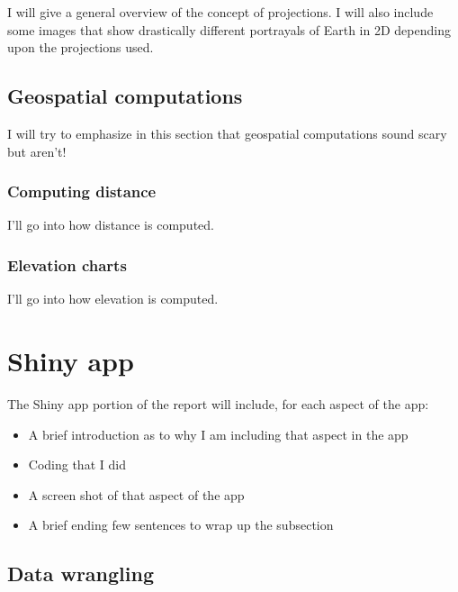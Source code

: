 \documentclass[12pt]{article}
\providecommand{\tightlist}{%
  \setlength{\itemsep}{0pt}\setlength{\parskip}{0pt}}
\begin{document}
I will give a general overview of the concept of projections. I will
also include some images that show drastically different portrayals of
Earth in 2D depending upon the projections used.

\hypertarget{geospatial-computations}{%
\subsection{Geospatial computations}\label{geospatial-computations}}

I will try to emphasize in this section that geospatial computations
sound scary but aren't!

\hypertarget{computing-distance}{%
\subsubsection{Computing distance}\label{computing-distance}}

I'll go into how distance is computed.

\hypertarget{elevation-charts}{%
\subsubsection{Elevation charts}\label{elevation-charts}}

I'll go into how elevation is computed.

\hypertarget{shiny-app}{%
\section{Shiny app}\label{shiny-app}}

The Shiny app portion of the report will include, for each aspect of the
app:

\begin{itemize}
\tightlist
\item
  A brief introduction as to why I am including that aspect in the app
\item
  Coding that I did
\item
  A screen shot of that aspect of the app
\item
  A brief ending few sentences to wrap up the subsection
\end{itemize}

\hypertarget{data-wrangling}{%
\subsection{Data wrangling}\label{data-wrangling}}
\end{document}
